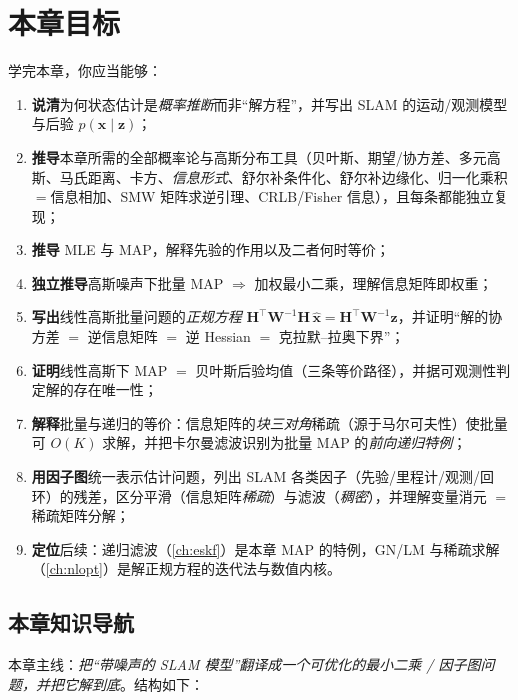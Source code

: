 \section*{本章目标}
学完本章，你应当能够：
\begin{enumerate}
  \item \textbf{说清}为何状态估计是\emph{概率推断}而非“解方程”，并写出 SLAM 的运动/观测模型与后验 $p(\mathbf{x}\mid\mathbf{z})$；
  \item \textbf{推导}本章所需的全部概率论与高斯分布工具（贝叶斯、期望/协方差、多元高斯、马氏距离、卡方、\emph{信息形式}、舒尔补条件化、舒尔补边缘化、归一化乘积$=$信息相加、SMW 矩阵求逆引理、CRLB/Fisher 信息），且每条都能独立复现；
  \item \textbf{推导} MLE 与 MAP，解释先验的作用以及二者何时等价；
  \item \textbf{独立推导}高斯噪声下批量 MAP $\Longrightarrow$ 加权最小二乘，理解信息矩阵即权重；
  \item \textbf{写出}线性高斯批量问题的\emph{正规方程} $\mathbf{H}^\top\mathbf{W}^{-1}\mathbf{H}\,\hat{\mathbf{x}}=\mathbf{H}^\top\mathbf{W}^{-1}\mathbf{z}$，并证明“解的协方差 $=$ 逆信息矩阵 $=$ 逆 Hessian $=$ 克拉默–拉奥下界”；
  \item \textbf{证明}线性高斯下 MAP $=$ 贝叶斯后验均值（三条等价路径），并据可观测性判定解的存在唯一性；
  \item \textbf{解释}批量与递归的等价：信息矩阵的\emph{块三对角}稀疏（源于马尔可夫性）使批量可 $O(K)$ 求解，并把卡尔曼滤波识别为批量 MAP 的\emph{前向递归特例}；
  \item \textbf{用因子图}统一表示估计问题，列出 SLAM 各类因子（先验/里程计/观测/回环）的残差，区分平滑（信息矩阵\emph{稀疏}）与滤波（\emph{稠密}），并理解变量消元 $=$ 稀疏矩阵分解；
  \item \textbf{定位}后续：递归滤波（\cref{ch:eskf}）是本章 MAP 的特例，GN/LM 与稀疏求解（\cref{ch:nlopt}）是解正规方程的迭代法与数值内核。
\end{enumerate}

\subsection*{本章知识导航}
本章主线：\emph{把“带噪声的 SLAM 模型”翻译成一个可优化的最小二乘 / 因子图问题，并把它解到底}。结构如下：

